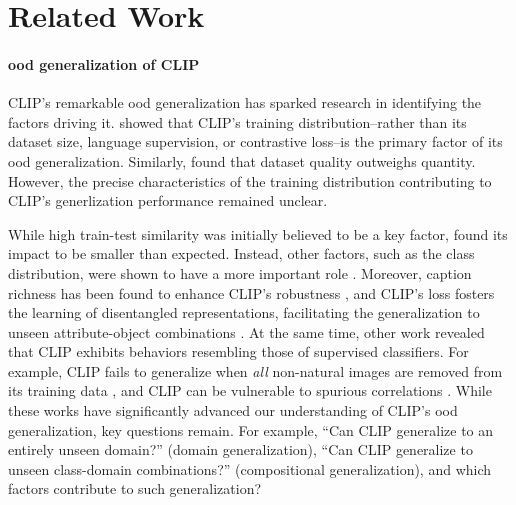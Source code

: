\section{Related Work}\label{sec:related-work}
\paragraph{\acrshort{ood} generalization of CLIP}
CLIP's remarkable \acrshort{ood} generalization has sparked research in identifying the factors driving it.
\citet{fang2022data} showed that CLIP's training distribution--rather than its dataset size, language supervision, or contrastive loss--is the primary factor of its \acrshort{ood} generalization. Similarly, \citet{nguyen2022quality} found that dataset quality outweighs quantity. However, the precise characteristics of the training distribution contributing to CLIP's generlization performance remained unclear.

While high train-test similarity was initially believed to be a key factor, \citet{mayilvahanan2024does} found its impact to be smaller than expected. Instead, other factors, such as the class distribution, were shown to have a more important role \citep{wen2024makes}.
Moreover, caption richness has been found to enhance CLIP's robustness \citep{xue2024understanding,wen2024makes}, and CLIP's loss fosters the learning of disentangled representations, facilitating the generalization to unseen attribute-object combinations \citep{abbasi2024deciphering}.
At the same time, other work revealed that CLIP exhibits behaviors resembling those of supervised classifiers. For example, CLIP fails to generalize when \emph{all} non-natural images are removed from its training data \citep{mayilvahanan2024search}, and CLIP can be vulnerable to spurious correlations \citep{wang2024sober}.
While these works have significantly advanced our understanding of CLIP's \acrshort{ood} generalization, key questions remain. For example, ``Can CLIP generalize to an entirely unseen domain?'' (domain generalization), ``Can CLIP generalize to unseen class-domain combinations?'' (compositional generalization), and which factors contribute to such generalization?

